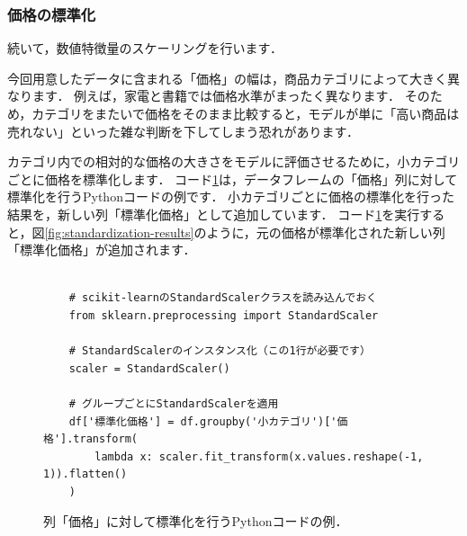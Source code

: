 
\subsubsection*{価格の標準化}
続いて，数値特徴量のスケーリングを行います．

今回用意したデータに含まれる「価格」の幅は，商品カテゴリによって大きく異なります．
例えば，家電と書籍では価格水準がまったく異なります．
そのため，カテゴリをまたいで価格をそのまま比較すると，モデルが単に「高い商品は売れない」といった雑な判断を下してしまう恐れがあります．

カテゴリ内での相対的な価格の大きさをモデルに評価させるために，小カテゴリごとに価格を標準化します．
コード\ref{code:standardization}は，データフレームの「価格」列に対して標準化を行うPythonコードの例です．
小カテゴリごとに価格の標準化を行った結果を，新しい列「標準化価格」として追加しています．
コード\ref{code:standardization}を実行すると，図\ref{fig:standardization-results}のように，元の価格が標準化された新しい列「標準化価格」が追加されます．
\begin{figure}[!htbp]
    \begin{verbatim}

    # scikit-learnのStandardScalerクラスを読み込んでおく
    from sklearn.preprocessing import StandardScaler

    # StandardScalerのインスタンス化（この1行が必要です）
    scaler = StandardScaler()

    # グループごとにStandardScalerを適用
    df['標準化価格'] = df.groupby('小カテゴリ')['価格'].transform(
        lambda x: scaler.fit_transform(x.values.reshape(-1, 1)).flatten()
    )

    \end{verbatim}
    \captionsetup{name=コード}
    \caption{列「価格」に対して標準化を行うPythonコードの例．}
    \label{code:standardization}
\end{figure}

